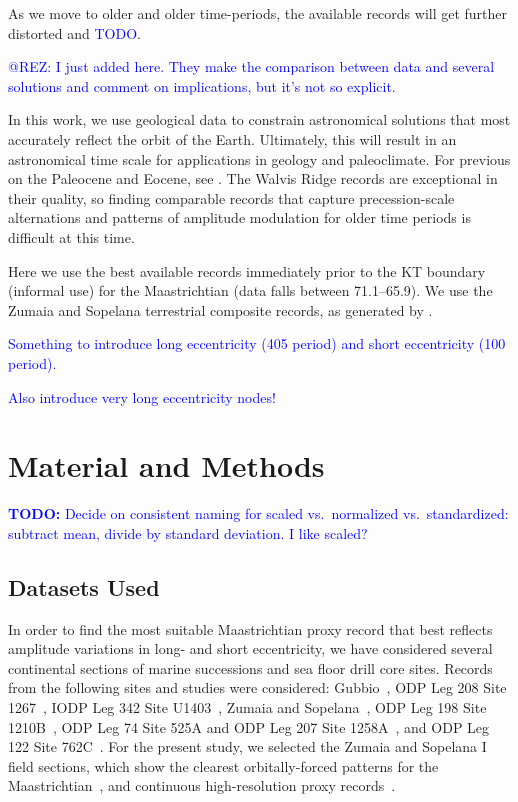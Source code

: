 \documentclass[draft]{agujournal2019}
\newcommand{\ijk}{\textcolor{blue}}
\begin{document}
As we move to older and older time-periods, the available records will get further distorted and \ijk{TODO}.

\ijk{@REZ: I just added \cite{Westerhold2017} here. They make the comparison between data and several solutions and comment on implications, but it's not so explicit.}

In this work, we use geological data to constrain astronomical solutions that most accurately reflect the orbit of the Earth.
Ultimately, this will result in an astronomical time scale for applications in geology and paleoclimate.
For previous on the Paleocene and Eocene, see .
The Walvis Ridge records are exceptional in their quality, so finding comparable records that capture precession-scale alternations and patterns of amplitude modulation for older time periods is difficult at this time.

Here we use the best available records immediately prior to the \gls{KT} boundary (informal use)
for the Maastrichtian (data falls between \qtyrange{71.1}{65.9}{\millionyearago}).
We use the Zumaia and Sopelana terrestrial composite records, as generated by .

\ijk{Something to introduce long eccentricity (\qty{405}{\kiloyear} period) and short eccentricity (\qty{100}{\kiloyear} period).}

\ijk{Also introduce very long eccentricity nodes!}


\section{Material and Methods}\label{sec:mm}

\ijk{\textbf{TODO:} Decide on consistent naming for
scaled vs.\
normalized vs.\
standardized:
subtract mean, divide by standard deviation. I like scaled?}

\subsection{Datasets Used}\label{sec:data}

In order to find the most suitable Maastrichtian proxy record that best reflects amplitude variations in long- and short eccentricity,
we have considered several continental sections of marine successions and sea floor drill core sites.
Records from the following sites and studies were considered:
Gubbio~\cite{Voigt2012,Sinnesael2016},
ODP Leg 208 Site 1267~\cite{Westerhold2007,Westerhold2008,Husson2011},
IODP Leg 342 Site U1403~\cite{Batenburg2018},
Zumaia and Sopelana~\cite{tenKateSprenger1993,Batenburg2012,Batenburg2014,Dinares-Turell2013},
ODP Leg 198 Site 1210B~\cite{Jung2012,Kim2022},
ODP Leg 74 Site 525A and ODP Leg 207 Site 1258A~\citeA{Husson2011},
and ODP Leg 122 Site 762C~.
For the present study, we selected the Zumaia and Sopelana I field sections,
which show the clearest orbitally-forced patterns for the Maastrichtian~\cite{Dinares-Turell2013},
and continuous high-resolution proxy records~\cite{Batenburg2012,Batenburg2014}.
\end{document}
